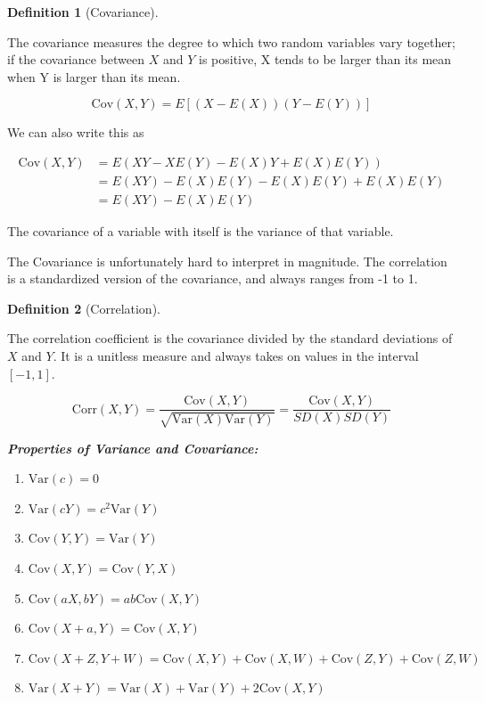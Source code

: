 \documentclass[
  letterpaper,
]{book}
\providecommand{\tightlist}{%
  \setlength{\itemsep}{0pt}\setlength{\parskip}{0pt}}\usepackage{longtable,booktabs,array}
\theoremstyle{definition}
\newtheorem{definition}{Definition}[chapter]
\theoremstyle{definition}
\theoremstyle{plain}
\theoremstyle{definition}
\theoremstyle{plain}
\theoremstyle{plain}
\theoremstyle{remark}
\begin{document}
\leavevmode{}%
\begin{definition}[Covariance]\label{def-}

The covariance measures the degree to which two random variables vary
together; if the covariance between \(X\) and \(Y\) is positive, X tends
to be larger than its mean when Y is larger than its mean.

\[\text{Cov}(X,Y) = E[(X - E(X))(Y - E(Y))] \]

We can also write this as

\begin{align*}
\text{Cov}(X,Y) &= E\left(XY - XE(Y) - E(X)Y + E(X)E(Y)\right)\\
&= E(XY) - E(X)E(Y) - E(X)E(Y) + E(X)E(Y)\\
&= E(XY) - E(X)E(Y)
\end{align*}

\end{definition}

The covariance of a variable with itself is the variance of that
variable.

The Covariance is unfortunately hard to interpret in magnitude. The
correlation is a standardized version of the covariance, and always
ranges from -1 to 1.

\leavevmode{}%
\begin{definition}[Correlation]\label{def-}

The correlation coefficient is the covariance divided by the standard
deviations of \(X\) and \(Y\). It is a unitless measure and always takes
on values in the interval \([-1,1]\).

\[\text{Corr}(X, Y) = \frac{\text{Cov}(X,Y)}{\sqrt{\text{Var}(X)\text{Var}(Y)}} = \frac{\text{Cov}(X,Y)}{SD(X)SD(Y)}\]

\end{definition}

\textbf{\emph{Properties of Variance and Covariance:}}

\hypertarget{prop-}{}
\begin{enumerate}
\def\labelenumi{\arabic{enumi}.}
\tightlist
\item
  \(\text{Var}(c) = 0\)
\item
  \(\text{Var}(cY) = c^2 \text{Var}(Y)\)
\item
  \(\text{Cov}(Y,Y) = \text{Var}(Y)\)
\item
  \(\text{Cov}(X,Y) = \text{Cov}(Y,X)\)
\item
  \(\text{Cov}(aX,bY) = ab \text{Cov}(X,Y)\)
\item
  \(\text{Cov}(X+a,Y) = \text{Cov}(X,Y)\)
\item
  \(\text{Cov}(X+Z,Y+W) = \text{Cov}(X,Y) + \text{Cov}(X,W) + \text{Cov}(Z,Y) + \text{Cov}(Z,W)\)
\item
  \(\text{Var}(X+Y) = \text{Var}(X) + \text{Var}(Y) + 2\text{Cov}(X,Y)\)
\end{enumerate}
\end{document}
